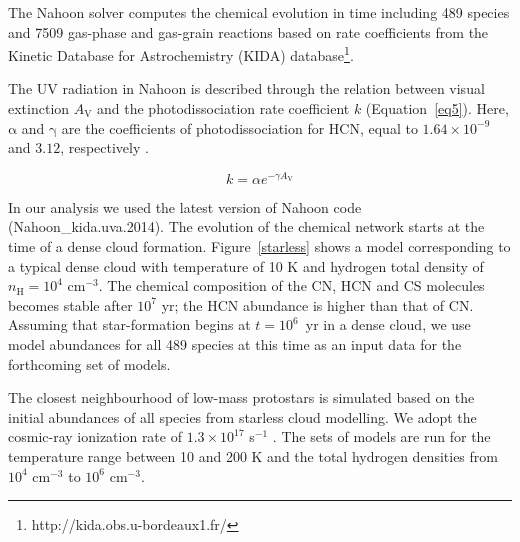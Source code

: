 \documentclass{aa}
\begin{document}
The Nahoon solver computes the chemical evolution in time including 489 species
and 7509 gas-phase and gas-grain reactions based on rate coefficients from the Kinetic
Database for Astrochemistry (KIDA) database\footnote{http://kida.obs.u-bordeaux1.fr/}. 

The UV radiation in Nahoon is described through the relation
between visual extinction $A_\mathrm{V}$ and the photodissociation rate coefficient $k$
(Equation~\ref{eq5}). Here, $\mathrm{\alpha}$ and $\mathrm{\gamma}$ are the coefficients
of photodissociation for HCN, equal to $1.64\times10^{-9}$ and $3.12$, respectively \citep{Hea17}.

\begin{equation} \label{eq5} 
k = \alpha e^{-\gamma A_\mathrm{V}} 
\end{equation} 

In our analysis we used the latest version of Nahoon code (Nahoon\_kida.uva.2014). 
The evolution of the chemical network starts at the time of a dense cloud formation.
Figure~\ref{starless} shows a model corresponding to a typical dense cloud with temperature of 10 K
and hydrogen total density of $n_\mathrm{H} = 10^4$ cm$^{-3}$. The chemical composition
of the CN, HCN and CS molecules becomes stable after $10^{7}$ yr; the HCN abundance is higher
than that of CN. Assuming that star-formation begins at $t = 10^6$~yr in a dense cloud, we use model abundances for all 489 species at this time as an input data for the forthcoming set of models.

The closest neighbourhood of low-mass protostars is simulated based on the initial abundances of
all species from starless cloud modelling. We adopt the cosmic-ray ionization
rate of $1.3\times 10^{17}$ s$^{-1}$ \citep{Cra78}. The sets of models are run
for the temperature range between 10 and 200 K and the total hydrogen densities from $10^4$
cm$^{-3}$ to $10^6$ cm$^{-3}$. 
\end{document}
